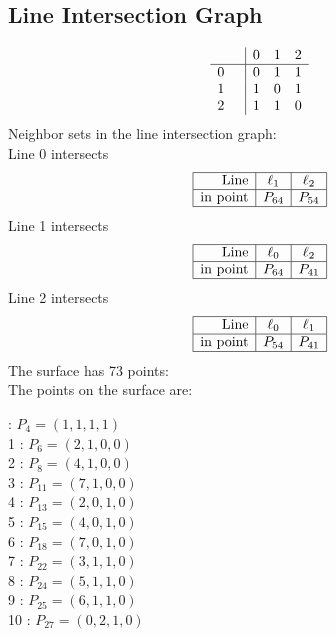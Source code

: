 \documentclass{article}
\begin{document}
{\subsection*{Line Intersection Graph}
{\arraycolsep=1pt
$$
\begin{array}{rr|*{3}r}
 &  & 0 & 1 & 2\\
\hline
0 &  & 0 & 1 & 1\\
1 &  & 1 & 0 & 1\\
2 &  & 1 & 1 & 0\\
\end{array}
$$
}%
Neighbor sets in the line intersection graph:\\
Line 0 intersects 
$$
\begin{array}{|r*{2}{|c}|}
\hline
\mbox{Line}  & \ell_{1} & \ell_{2}\\
\hline
\mbox{in point}  & P_{64} & P_{54}\\
\hline
\end{array}
$$
Line 1 intersects 
$$
\begin{array}{|r*{2}{|c}|}
\hline
\mbox{Line}  & \ell_{0} & \ell_{2}\\
\hline
\mbox{in point}  & P_{64} & P_{41}\\
\hline
\end{array}
$$
Line 2 intersects 
$$
\begin{array}{|r*{2}{|c}|}
\hline
\mbox{Line}  & \ell_{0} & \ell_{1}\\
\hline
\mbox{in point}  & P_{54} & P_{41}\\
\hline
\end{array}
$$
The surface has 73 points:\\
The points on the surface are:\\
\begin{multicols}{3}
 : $P_{4}=( 1, 1, 1, 1 )$\\
1 : $P_{6}=( 2, 1, 0, 0 )$\\
2 : $P_{8}=( 4, 1, 0, 0 )$\\
3 : $P_{11}=( 7, 1, 0, 0 )$\\
4 : $P_{13}=( 2, 0, 1, 0 )$\\
5 : $P_{15}=( 4, 0, 1, 0 )$\\
6 : $P_{18}=( 7, 0, 1, 0 )$\\
7 : $P_{22}=( 3, 1, 1, 0 )$\\
8 : $P_{24}=( 5, 1, 1, 0 )$\\
9 : $P_{25}=( 6, 1, 1, 0 )$\\
10 : $P_{27}=( 0, 2, 1, 0 )$\\

\end{multicols}}
\end{document}

